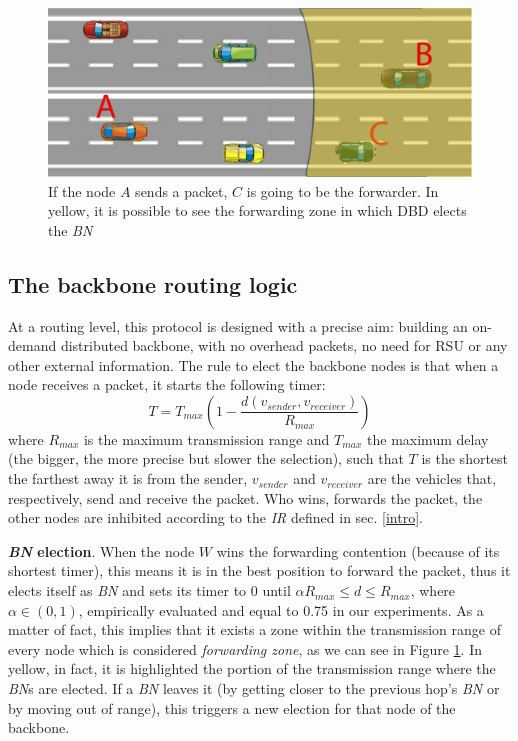 \documentclass{sig-alternate-2013}
\begin{document}
\begin{figure}[tb]
\begin{center}
\includegraphics[width=.9\columnwidth]{./fig/CarreggiataNOc.eps}
\caption{If the node $A$ sends a packet, $C$ is going to be the forwarder. In yellow, it is possible to see the forwarding zone in which DBD elects the \textit{BN}}
\label{fig:carreggiata}
\end{center}
\end{figure}



\subsection{The backbone routing logic}
\label{DBD}

At a routing level, this protocol is designed with a precise aim: building an on-demand distributed backbone, with no overhead packets, no need for RSU or any other external information.
The rule to elect the backbone nodes is that when a node receives a packet, it starts the following timer:
\begin{equation}
\label{eq:timer}
T = T_{max} \left(1- \frac{d(v_{sender},v_{receiver})}{R_{max}}\right)
\end{equation}
where $R_{max}$ is the maximum transmission range and $T_{max}$ the maximum delay (the bigger, the more precise but slower the selection), such that $T$ is the shortest the farthest away it is from the sender, $v_{sender}$ and $v_{receiver}$ are the vehicles that, respectively, send and receive the packet. Who wins, forwards the packet, the other nodes are inhibited according to the \textit{IR} defined in sec. \ref{intro}.

\textbf{\textit{BN} election}. When the node $W$ wins the forwarding contention (because of its shortest timer), this means it is in the best position to forward the packet, thus it elects itself as \textit{BN} and sets its timer to 0 until $\alpha R_{max} \le d \le R_{max}$, where $\alpha \in (0,1)$, empirically evaluated and equal to 0.75 in our experiments. As a matter of fact, this implies that it exists a zone within the transmission range of every node which is considered \textit{forwarding zone}, as we can see in Figure \ref{fig:carreggiata}. In yellow, in fact, it is highlighted the portion of the transmission range where the \textit{BN}s are elected. If a \textit{BN} leaves it (by getting closer to the previous hop's \textit{BN} or by moving out of range), this triggers a new election for that node of the backbone.
\end{document}

